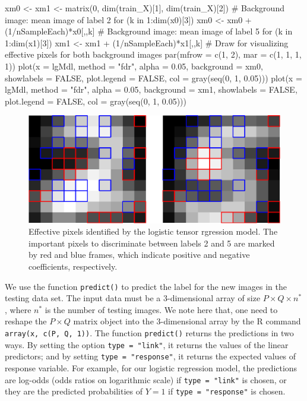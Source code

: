 \begin{Schunk}
\begin{Sinput}
xm0 <- xm1 <- matrix(0, dim(train_X)[1], dim(train_X)[2])
# Background image: mean image of label 2
for (k in 1:dim(x0)[3]) {
  xm0 <- xm0 + (1/nSampleEach)*x0[,,k]
}
# Background image: mean image of label 5
for (k in 1:dim(x1)[3]) {
  xm1 <- xm1 + (1/nSampleEach)*x1[,,k]
}
# Draw for visualizing effective pixels for both background images 
par(mfrow = c(1, 2), mar = c(1, 1, 1, 1))
plot(x = lgMdl, method = "fdr", alpha = 0.05, background = xm0, 
     showlabels = FALSE, plot.legend = FALSE, col = gray(seq(0, 1, 0.05)))
plot(x = lgMdl, method = "fdr", alpha = 0.05, background = xm1, 
     showlabels = FALSE, plot.legend = FALSE, col = gray(seq(0, 1, 0.05)))
\end{Sinput}
\begin{figure}

{\centering \includegraphics[width=0.95\linewidth]{chen-chang-chen-tzeng-chang_files/figure-latex/mnistplot-1} 

}

\caption[Effective pixels identified by the logistic tensor rgression model]{Effective pixels identified by the logistic tensor rgression model. The important pixels to discriminate between labels 2 and 5 are marked by red and blue frames, which indicate positive and negative coefficients, respectively.}\label{fig:mnistplot}
\end{figure}
\end{Schunk}

We use the function \texttt{predict()} to predict the label for the new
images in the testing data set. The input data must be a 3-dimensional
array of size \(P \times Q \times n^*\), where \(n^*\) is the number of
testing images. We note here that, one need to reshape the
\(P \times Q\) matrix object into the 3-dimensional array by the R
command \texttt{array(x,\ c(P,\ Q,\ 1))}. The function
\texttt{predict()} returns the predictions in two ways. By setting the
option \texttt{type\ =\ "link"}, it returns the values of the linear
predictors; and by setting \texttt{type\ =\ "response"}, it returns the
expected values of response variable. For example, for our logistic
regression model, the predictions are log-odds (odds ratios on
logarithmic scale) if \texttt{type\ =\ "link"} is chosen, or they are
the predicted probabilities of \(Y = 1\) if \texttt{type\ =\ "response"}
is chosen.

